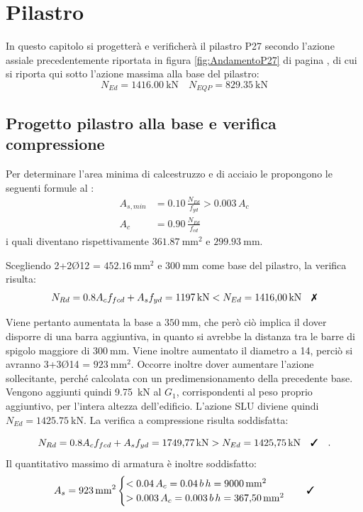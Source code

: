 \chapter{Pilastro}

In questo capitolo si progetterà e verificherà il pilastro P27 secondo l'azione assiale precedentemente riportata in figura \ref{fig:AndamentoP27} di pagina \pageref{fig:AndamentoP27}, di cui si riporta qui sotto l'azione massima alla base del pilastro:
\begin{equation}
    N_{Ed} = \SI{1416.00}{\kilo\newton} \quad N_{EQP} = \SI{829.35}{\kilo\newton}
\end{equation}
\section{Progetto pilastro alla base e verifica compressione}
Per determinare l'area minima di calcestruzzo e di acciaio le  propongono le seguenti formule al :
\begin{align}
    A_{s,min} &= 0.10\,\frac{N_{Ed}}{f_{yd}}  > 0.003 \, A_c \\
    A_c &= 0.90\,\frac{N_{Ed}}{f_{cd}}
\end{align}
i quali diventano rispettivamente $\SI{361.87}{\milli\metre\squared}$ e $\SI{299.93}{\milli\metre}$.

Scegliendo 2+2Ø12 = $\SI{452.16}{\milli\metre\squared}$ e  $\SI{300}{\milli\metre}$ come base del pilastro, la verifica risulta:
\begin{equation}
    N_{Rd} = 0.8 A_c f_{fcd} + A_s f_{yd} = \SI{1197}{\kilo\newton} < N_{Ed} = \SI{1416.00}{\kilo\newton} \quad \notchecked
\end{equation}

Viene pertanto aumentata la base a $\SI{350}{\milli\metre}$, che però ciò implica il dover disporre di una barra aggiuntiva, in quanto si avrebbe la distanza tra le barre di spigolo maggiore di $\SI{300}{\milli\metre}$.
Viene inoltre aumentato il diametro a 14, perciò si avranno 3+3Ø14 = $\SI{923}{\milli\metre\squared}$.
Occorre inoltre dover aumentare l'azione sollecitante, perché calcolata con un predimensionamento della precedente base. 
Vengono aggiunti quindi \SI{9.75}{\kilo\newton} al $G_1$, corrispondenti al peso proprio aggiuntivo, per l'intera altezza dell'edificio.
L'azione SLU diviene quindi $N_{Ed} = \SI{1425.75}{\kilo\newton}$. 
La verifica a compressione risulta soddisfatta:

\begin{equation}
    N_{Rd} = 0.8 A_c f_{fcd} + A_s f_{yd} = \SI{1749.77}{\kilo\newton} > N_{Ed} = \SI{1425.75}{\kilo\newton} \quad \checked \quad .
\end{equation}
Il quantitativo massimo di armatura è inoltre soddisfatto:
\begin{equation}
    A_s =
      \SI{923}{\milli\metre\squared} 
    \begin{cases}
      < 0.04 \, A_c = 0.04 \, b \, h = \SI{9000}{\milli\metre\squared} \\
      > 0.003 \, A_c = 0.003 \, b \, h = \SI{367.50}{\milli\metre\squared}
    \end{cases}
    \quad \checked
  \end{equation}

